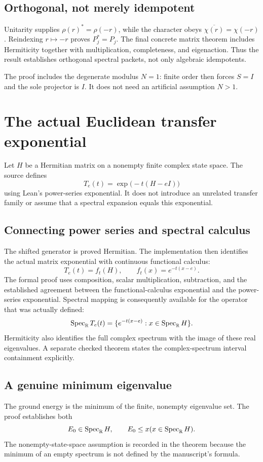 \subsection{Orthogonal, not merely idempotent}
Unitarity supplies $\rho(r)^*=\rho(-r)$, while the character obeys $\overline{\chi(r)}=\chi(-r)$. Reindexing $r\mapsto-r$ proves $P_j^*=P_j$. The final concrete matrix theorem includes Hermiticity together with multiplication, completeness, and eigenaction. Thus the result establishes orthogonal spectral packets, not only algebraic idempotents.

The proof includes the degenerate modulus $N=1$: finite order then forces $S=I$ and the sole projector is $I$. It does not need an artificial assumption $N>1$.





\section{The actual Euclidean transfer exponential}\label{supp3:section:004}
Let $H$ be a Hermitian matrix on a nonempty finite complex state space. The source defines
\[
T_e(t)=\exp\bigl(-t(H-eI)\bigr)
\]
using Lean's power-series exponential. It does not introduce an unrelated transfer family or assume that a spectral expansion equals this exponential.

\subsection{Connecting power series and spectral calculus}
The shifted generator is proved Hermitian. The implementation then identifies the actual matrix exponential with continuous functional calculus:
\[
\boxed{T_e(t)=f_t(H),\qquad f_t(x)=e^{-t(x-e)}.}
\]
The formal proof uses composition, scalar multiplication, subtraction, and the established agreement between the functional-calculus exponential and the power-series exponential. Spectral mapping is consequently available for the operator that was actually defined:
\[
\Spec_\R T_e(t)=\{e^{-t(x-e)}:x\in\Spec_\R H\}.
\]
Hermiticity also identifies the full complex spectrum with the image of these real eigenvalues. A separate checked theorem states the complex-spectrum interval containment explicitly.

\subsection{A genuine minimum eigenvalue}
The ground energy is the minimum of the finite, nonempty eigenvalue set. The proof establishes both
\[
E_0\in\Spec_\R H,\qquad E_0\le x\quad(x\in\Spec_\R H).
\]
The nonempty-state-space assumption is recorded in the theorem because the minimum of an empty spectrum is not defined by the manuscript's formula.

